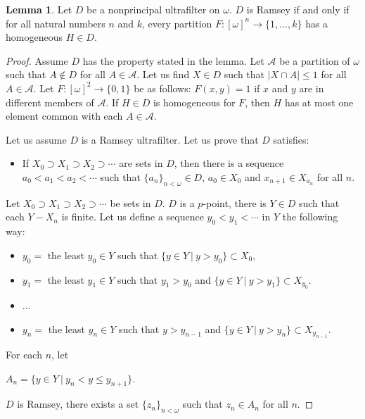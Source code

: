 \documentclass[8pt]{article}
\theoremstyle{definition}
\theoremstyle{definition}
\theoremstyle{definition}
\theoremstyle{definition}
\theoremstyle{definition}
\theoremstyle{definition}
\theoremstyle{definition}
\theoremstyle{definition}
\newtheorem{lemma}{Lemma}[section]
\theoremstyle{definition}
\theoremstyle{definition}
\theoremstyle{definition}
\theoremstyle{definition}
\theoremstyle{definition}
\theoremstyle{definition}
\theoremstyle{question}
\begin{document}
\begin{lemma}
  Let $D$ be a nonprincipal ultrafilter on $\omega$. $D$ is Ramsey if and only if
  for all natural numbers $n$ and $k$, every partition $F : [\omega]^n \to \{ 1, \ldots, k\}$
  has a homogeneous $H \in D$.
\end{lemma}

\begin{proof}
  Assume $D$ has the property stated in the lemma. Let $\mathcal{A}$ be a partition of $\omega$ such that $A \notin D$ for
  all $A \in \mathcal{A}$. Let us find $X \in D$ such that $|X \cap A| \leq 1$ for all $A \in \mathcal{A}$.
  Let $F : [\omega]^2 \to \{ 0, 1 \}$ be as follows: $F(x, y) = 1$ if $x$ and $y$ are in different members of $\mathcal{A}$.
  If $H \in D$ is homogeneous for $F$, then $H$ has at most one element common with each $A \in \mathcal{A}$.

  Let us assume $D$ is a Ramsey ultrafilter. Let us prove that $D$ satisfies:
  \begin{itemize}
    \item If $X_0 \supset X_1 \supset X_2 \supset \cdots$ are sets in $D$, then there is a sequence
    $a_0 < a_1 < a_2 < \cdots$ such that $\{ a_n\}_{n < \omega} \in D$, $a_0 \in X_0$ and $x_{n + 1} \in X_{a_n}$
    for all $n$.
  \end{itemize}

  Let $X_0 \supset X_1 \supset X_2 \supset \cdots$ be sets in $D$. $D$ is a $p$-point,
  there is $Y \in D$ such that each $Y-X_n$ is finite. Let us define a sequence $y_0 < y_1 < \cdots$ in $Y$
  the following way:
  \begin{itemize}
    \item $y_0 =$ the least $y_0 \in Y$ such that $\{ y \in Y \: | \: y > y_0 \} \subset X_0$,
    \item $y_1 =$ the least $y_1 \in Y$ such that $y_1 > y_0$ and $\{ y \in Y \: | \: y > y_1\} \subset X_{y_0}$. 
    \item ...
    \item $y_n=$ the least $y_n \in Y$ such that $y > y_{n - 1}$ and $\{ y \in Y \: | \: y > y_n\} \subset X_{y_{n - 1}}$.
  \end{itemize}

  For each $n$, let
  \begin{center}
    $A_n = \{ y \in Y \: | \: y_n < y \leq y_{n + 1}\}$.
  \end{center}
  $D$ is Ramsey, there exists a set $\{ z_n\}_{n < \omega}$ such that $z_n \in A_n$ for all $n$.


\end{proof}
\end{document}
